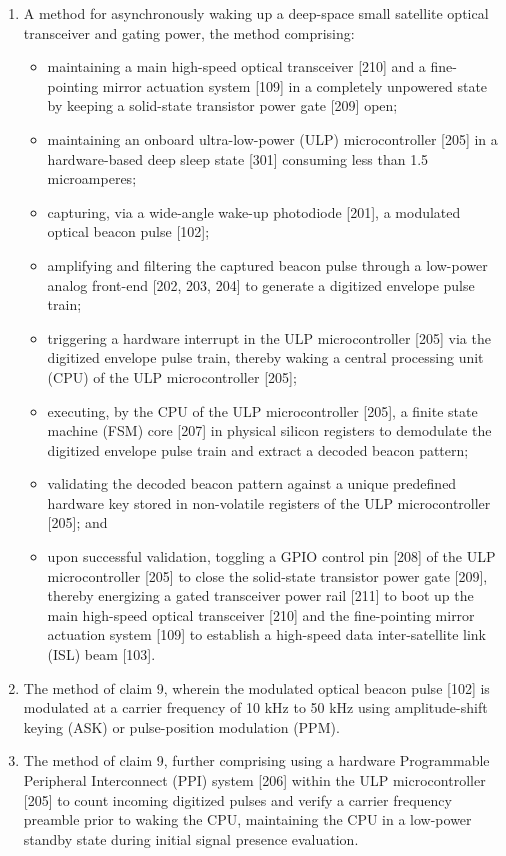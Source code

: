 \documentclass[12pt,a4paper]{article}
\begin{document}
\begin{enumerate}
    \item A method for asynchronously waking up a deep-space small satellite optical transceiver and gating power, the method comprising:
    \begin{itemize}
        \item maintaining a main high-speed optical transceiver [210] and a fine-pointing mirror actuation system [109] in a completely unpowered state by keeping a solid-state transistor power gate [209] open;
        \item maintaining an onboard ultra-low-power (ULP) microcontroller [205] in a hardware-based deep sleep state [301] consuming less than 1.5 microamperes;
        \item capturing, via a wide-angle wake-up photodiode [201], a modulated optical beacon pulse [102];
        \item amplifying and filtering the captured beacon pulse through a low-power analog front-end [202, 203, 204] to generate a digitized envelope pulse train;
        \item triggering a hardware interrupt in the ULP microcontroller [205] via the digitized envelope pulse train, thereby waking a central processing unit (CPU) of the ULP microcontroller [205];
        \item executing, by the CPU of the ULP microcontroller [205], a finite state machine (FSM) core [207] in physical silicon registers to demodulate the digitized envelope pulse train and extract a decoded beacon pattern;
        \item validating the decoded beacon pattern against a unique predefined hardware key stored in non-volatile registers of the ULP microcontroller [205]; and
        \item upon successful validation, toggling a GPIO control pin [208] of the ULP microcontroller [205] to close the solid-state transistor power gate [209], thereby energizing a gated transceiver power rail [211] to boot up the main high-speed optical transceiver [210] and the fine-pointing mirror actuation system [109] to establish a high-speed data inter-satellite link (ISL) beam [103].
    \end{itemize}

    \item The method of claim 9, wherein the modulated optical beacon pulse [102] is modulated at a carrier frequency of 10 kHz to 50 kHz using amplitude-shift keying (ASK) or pulse-position modulation (PPM).

    \item The method of claim 9, further comprising using a hardware Programmable Peripheral Interconnect (PPI) system [206] within the ULP microcontroller [205] to count incoming digitized pulses and verify a carrier frequency preamble prior to waking the CPU, maintaining the CPU in a low-power standby state during initial signal presence evaluation.


\end{enumerate}
\end{document}
